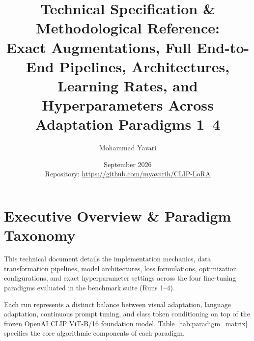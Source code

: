 \documentclass[letterpaper,11pt,leqno]{article}
\begin{document}
\title{\textbf{Technical Specification \& Methodological Reference:}\\[0.3em]
\Large Exact Augmentations, Full End-to-End Pipelines, Architectures, Learning Rates, and Hyperparameters Across Adaptation Paradigms 1--4}
\author{Mohammad Yavari}
\date{September 2026 \\[0.5em] \small Repository: \url{https://github.com/myavarih/CLIP-LoRA}}

\begin{titlepage}
\maketitle
\end{titlepage}

\tableofcontents
\newpage

\section{Executive Overview \& Paradigm Taxonomy}

This technical document details the implementation mechanics, data transformation pipelines, model architectures, loss formulations, optimization configurations, and exact hyperparameter settings across the four fine-tuning paradigms evaluated in the benchmark suite (Runs 1--4). 

Each run represents a distinct balance between visual adaptation, language adaptation, continuous prompt tuning, and class token conditioning on top of the frozen OpenAI CLIP ViT-B/16 foundation model. Table~\ref{tab:paradigm_matrix} specifies the core algorithmic components of each paradigm.
\end{document}

